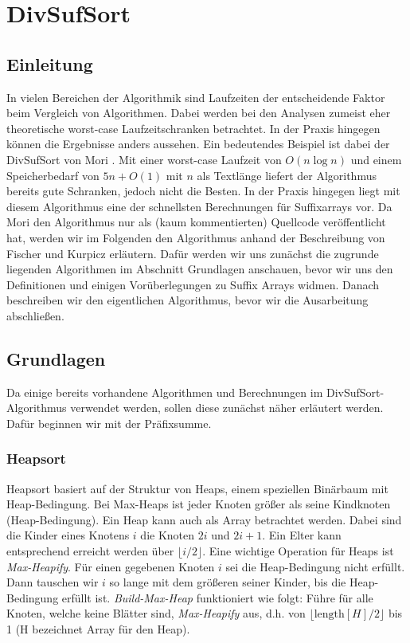 \section{DivSufSort}
\label{algorithm:divsufsort}

\subsection{Einleitung}
In  vielen Bereichen der Algorithmik sind Laufzeiten der entscheidende Faktor beim Vergleich von Algorithmen. Dabei werden bei den Analysen zumeist eher theoretische worst-case Laufzeitschranken betrachtet.
In der Praxis hingegen können die Ergebnisse anders aussehen. Ein bedeutendes Beispiel ist dabei der DivSufSort von Mori \cite{saca:5:repo}. Mit einer worst-case Laufzeit von $O(n\log{n})$ und einem Speicherbedarf von $5n + O(1)$ mit $n$ als Textlänge liefert der Algorithmus bereits gute Schranken, jedoch nicht die Besten. In der Praxis hingegen liegt mit diesem Algorithmus eine der schnellsten Berechnungen für Suffixarrays vor. Da Mori den Algorithmus nur als (kaum kommentierten) Quellcode veröffentlicht hat, werden wir im Folgenden den Algorithmus anhand der Beschreibung von Fischer und Kurpicz \cite{saca:5} erläutern. Dafür werden wir uns zunächst die zugrunde liegenden Algorithmen im Abschnitt Grundlagen anschauen, bevor wir uns den Definitionen und einigen Vorüberlegungen zu Suffix Arrays widmen. Danach beschreiben wir den eigentlichen Algorithmus, bevor wir die Ausarbeitung abschließen.

\iffalse
\subsection{Grundlagen}
Da einige bereits vorhandene Algorithmen und Berechnungen im DivSufSort-Algorithmus verwendet werden, sollen diese zunächst näher erläutert werden. Dafür beginnen wir mit der Präfixsumme.


\subsubsection{Heapsort}
Heapsort basiert auf der Struktur von Heaps, einem speziellen Binärbaum mit Heap-Bedingung. Bei Max-Heaps ist jeder Knoten größer als seine Kindknoten (Heap-Bedingung). Ein Heap kann auch als Array betrachtet werden. Dabei sind die Kinder eines Knotens $i$ die Knoten $2i$ und $2i + 1$. Ein Elter kann entsprechend erreicht werden über $\lfloor i/2 \rfloor$. Eine wichtige Operation für Heaps ist \textit{Max-Heapify}. Für einen gegebenen Knoten $i$ sei die Heap-Bedingung nicht erfüllt. Dann tauschen wir $i$ so lange mit dem größeren seiner Kinder, bis die Heap-Bedingung erfüllt ist. \textit{Build-Max-Heap} funktioniert wie folgt: Führe für alle Knoten, welche keine Blätter sind, \textit{Max-Heapify} aus, d.h. von $\lfloor \text{length}[H]/2\rfloor$ bis 1 (H bezeichnet Array für den Heap).


